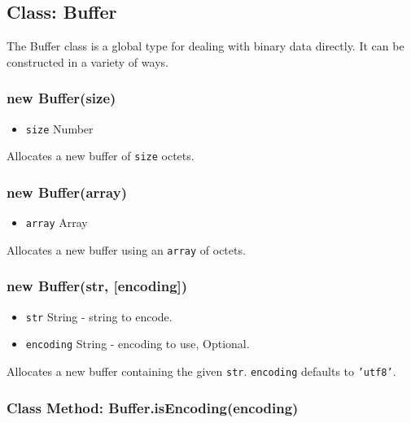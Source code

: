 \subsection{Class: Buffer}\label{class-buffer}

The Buffer class is a global type for dealing with binary data directly.
It can be constructed in a variety of ways.

\subsubsection{new Buffer(size)}\label{new-buffersize}

\begin{itemize}
\itemsep1pt\parskip0pt
\item
  \texttt{size} Number
\end{itemize}

Allocates a new buffer of \texttt{size} octets.

\subsubsection{new Buffer(array)}\label{new-bufferarray}

\begin{itemize}
\itemsep1pt\parskip0pt
\item
  \texttt{array} Array
\end{itemize}

Allocates a new buffer using an \texttt{array} of octets.

\subsubsection{new Buffer(str,
{[}encoding{]})}\label{new-bufferstr-encoding}

\begin{itemize}
\itemsep1pt\parskip0pt
\item
  \texttt{str} String - string to encode.
\item
  \texttt{encoding} String - encoding to use, Optional.
\end{itemize}

Allocates a new buffer containing the given \texttt{str}.
\texttt{encoding} defaults to \texttt{'utf8'}.

\subsubsection{Class Method:
Buffer.isEncoding(encoding)}\label{class-method-buffer.isencodingencoding}

